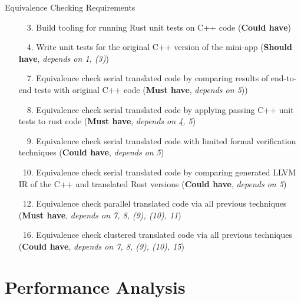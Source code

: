 \documentclass[10pt,aspectratio=169]{beamer}
\newcommand{\cmark}{\ding{51}}
\newcommand{\xmark}{\ding{55}}
\newcommand{\done}{\rlap{$\square$}{\raisebox{2pt}{\large\hspace{1pt}\textcolor{green}{\cmark}}}\hspace{-2.5pt}}
\newcommand{\wontfix}{\rlap{$\square$}{\large\hspace{1pt}\textcolor{red}{\xmark}}}
\newcommand{\partialdone}{\rlap{$\square$}{\raisebox{2pt}{\large\hspace{1pt}\textcolor{orange}{\cmark}}}\hspace{-2.5pt}}
\begin{document}
\begin{frame}{Equivalence Checking Requirements}
    \begin{itemize}
        \item[\done\ \ 3.]
          Build tooling for running Rust unit tests on C++ code
          (\textbf{Could have})
        \item[\done\ \ 4.]
          Write unit tests for the original C++ version of the
          mini-app
          (\textbf{Should have}, \textit{depends on 1, (3)})
        \item[\done\ \ 7.]
          Equivalence check serial translated code by comparing results of end-to-end tests with original C++ code
          (\textbf{Must have}, \textit{depends on 5}))
        \item[\done\ \ 8.]
          Equivalence check serial translated code by applying passing C++ unit tests to rust code
          (\textbf{Must have}, \textit{depends on 4, 5})
        \item[\wontfix\ \ 9.]
          Equivalence check serial translated code with limited formal verification techniques
          (\textbf{Could have}, \textit{depends on 5})
        \item[\partialdone\ 10.]
          Equivalence check serial translated code by comparing generated LLVM IR of the C++ and translated Rust versions
          (\textbf{Could have}, \textit{depends on 5})
        \item[\done\ 12.]
          Equivalence check parallel translated code via all previous techniques
          (\textbf{Must have}, \textit{depends on 7, 8, (9), (10), 11})
        \item[\done\ 16.]
          Equivalence check clustered translated code via all previous techniques
          (\textbf{Could have}, \textit{depends on 7, 8, (9), (10), 15})
    \end{itemize}
\end{frame}



\section{Performance Analysis}
\end{document}
